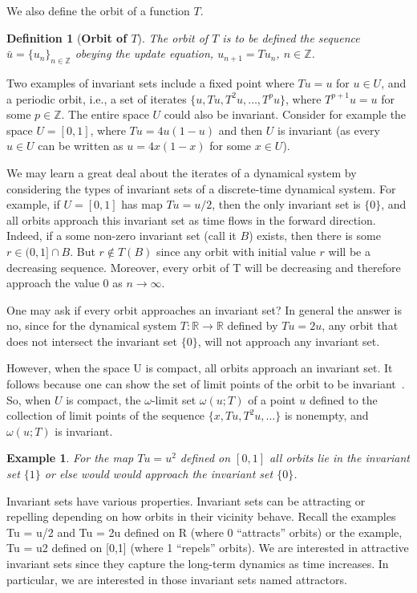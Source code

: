 \documentclass[a4paper,12pt,twoside]{report}
\newtheorem{Definition}{Definition}[]
\newtheorem{Example}{Example}[]
\begin{document}
We also define the orbit of a function $T$.
\begin{Definition}
  [\bf Orbit of $T$]\label{Dfn_Orbit}\rm
  The orbit of $T$ is to be defined the sequence $\bar{u} = \{u_n\}_{n\in \mathbb{Z}}$ obeying the update equation, $u_{n+1}=Tu_n$, $n \in \mathbb{Z}$. 
\end{Definition}

Two examples of invariant sets include a fixed point where $Tu=u$ for  $u\in U$, and a periodic orbit, i.e., a set of iterates $\{u,Tu, T^2u,\ldots,T^pu\}$, where $T^{p+1}u=u$ for some $p\in\mathbb{Z}$.  The entire space $U$ could also be invariant.
Consider for example the space $U=[0,1]$, where $Tu=4u(1-u)$ and then $U$ is invariant (as every $u\in{U}$ can be written as $u = 4x(1-x)$ for some $x\in{U}$).

We may learn a great deal about the iterates of a dynamical system by considering the types of invariant sets of a discrete-time dynamical system. For example, if $U=[0,1]$ has map $Tu= u/2$, then the only invariant set is $\{0\}$, and all orbits approach this invariant set as time flows in the forward direction. 
Indeed, if a some non-zero invariant set (call it $B$) exists, then there is  some $r\in(0,1]\cap{B}$. But $r\notin{T(B)}$ since any orbit with initial value $r$ will be a decreasing sequence. Moreover, every orbit of T will be decreasing and therefore approach the value $0$ as $n\rightarrow\infty$.

One may ask if every orbit approaches an invariant set? In general the answer is no, since for the dynamical system $T: \mathbb{R} \to \mathbb{R}$ defined by $Tu=2u$, any orbit that does not intersect the invariant set $\{0\}$, will not approach any invariant set. 

However, when the space U is compact, all orbits approach an invariant set. It follows because one can show the set of limit points of the orbit to be invariant~\cite{de2013elements}. So, when $U$ is compact,  the $\omega$-limit set $\omega(u;T)$ of a point $u$ defined to the collection of limit points of the sequence $\{x,Tu,T^2u,\ldots\}$ is nonempty, and $\omega(u;T)$ is invariant. 

\begin{Example}
  For the map $Tu=u^2$ defined on $[0,1]$ all orbits lie in the invariant set $\{1\}$ or else would would approach the invariant set $\{0\}$. 
\end{Example}


Invariant sets have various properties. Invariant sets can be attracting or repelling depending on how orbits in their vicinity behave. 
Recall the examples Tu = u/2 and Tu = 2u defined on R (where {0} “attracts” orbits) or the example, Tu = u2 defined on [0,1] (where {1} “repels” orbits). 
We are interested in attractive invariant sets since they capture the long-term dynamics as time increases. 
In particular, we are interested in those invariant sets named attractors.
\end{document}
